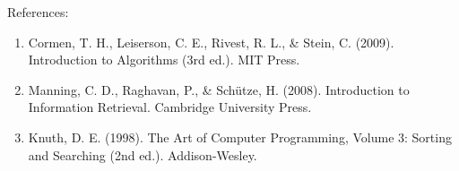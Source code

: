 \documentclass[10pt]{article}
\begin{document}
  \spacing
  \noindent
  References:

  \begin{enumerate}
    \item Cormen, T. H., Leiserson, C. E., Rivest, R. L., & Stein, C. (2009).
      Introduction to Algorithms (3rd ed.). MIT Press.

    \item Manning, C. D., Raghavan, P., & Schütze, H. (2008). Introduction to Information
      Retrieval. Cambridge University Press.

    \item Knuth, D. E. (1998). The Art of Computer Programming, Volume 3: Sorting
      and Searching (2nd ed.). Addison-Wesley.
  \end{enumerate}
\end{document}
